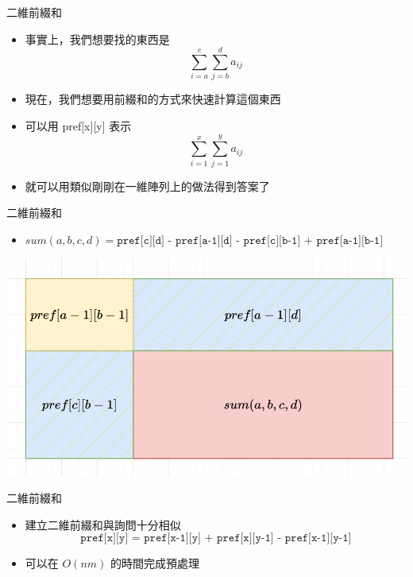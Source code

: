 \documentclass[aspectratio=169]{beamer}
\begin{document}
    \begin{frame}{二維前綴和}
        \begin{itemize}
            \item 事實上，我們想要找的東西是 
            $$\sum_{i=a}^c \sum_{j=b}^d a_{ij}$$
            \item 現在，我們想要用前綴和的方式來快速計算這個東西
            \item<2-> 可以用 pref[x][y] 表示  
            $$\sum_{i=1}^x \sum_{j=1}^y a_{ij}$$
            \item<2-> 就可以用類似剛剛在一維陣列上的做法得到答案了
        \end{itemize}
    \end{frame}
    
    \begin{frame}{二維前綴和}
        \begin{itemize}
            \item $sum(a,b,c,d) = \texttt{pref[c][d] - pref[a-1][d] - pref[c][b-1] + pref[a-1][b-1]}$
        \end{itemize}
        \begin{center}
            \includegraphics[scale=0.4]{images/2d_prefix_sum_2.png}
        \end{center}
    \end{frame}
    
    \begin{frame}{二維前綴和}
        \begin{itemize}
            \item 建立二維前綴和與詢問十分相似
            $$\texttt{pref[x][y] = pref[x-1][y] + pref[x][y-1] - pref[x-1][y-1]}$$
            \item 可以在 $O(nm)$ 的時間完成預處理
        \end{itemize}
    \end{frame}
    
\end{document}
